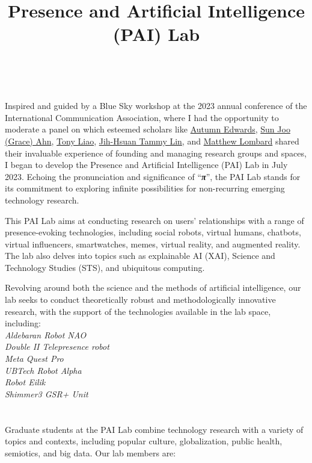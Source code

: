 \documentclass[]{article}
\title{Presence and Artificial Intelligence (PAI) Lab}
\author{}
\date{\vspace{-2.5em}}
\begin{document}
\maketitle

~

Inspired and guided by a Blue Sky workshop at the 2023 annual conference
of the International Communication Association, where I had the
opportunity to moderate a panel on which esteemed scholars like
\href{https://wmich.edu/communication/directory/edwards}{Autumn
Edwards}, \href{https://grady.uga.edu/faculty/sun-joo-grace-ahn/}{Sun
Joo (Grace) Ahn},
\href{https://dot.egr.uh.edu/departments/ilt/people/faculty/liao-tony}{Tony
Liao}, \href{https://drtammylin.com/}{Jih-Hsuan Tammy Lin}, and
\href{https://klein.temple.edu/directory/matthew-lombard-lombard}{Matthew
Lombard} shared their invaluable experience of founding and managing
research groups and spaces, I began to develop the Presence and
Artificial Intelligence (PAI) Lab in July 2023. Echoing the
pronunciation and significance of ``\textbf{\emph{π}}'', the PAI Lab
stands for its commitment to exploring infinite possibilities for
non-recurring emerging technology research.

This PAI Lab aims at conducting research on users' relationships with a
range of presence-evoking technologies, including social robots, virtual
humans, chatbots, virtual influencers, smartwatches, memes, virtual
reality, and augmented reality. The lab also delves into topics such as
explainable AI (XAI), Science and Technology Studies (STS), and
ubiquitous computing.

Revolving around both the science and the methods of artificial
intelligence, our lab seeks to conduct theoretically robust and
methodologically innovative research, with the support of the
technologies available in the lab space, including:\\
\emph{Aldebaran Robot NAO}\\
\emph{Double II Telepresence robot}\\
\emph{Meta Quest Pro}\\
\emph{UBTech Robot Alpha}\\
\emph{Robot Eilik}\\
\emph{Shimmer3 GSR+ Unit}\\
~\\
~\\
Graduate students at the PAI Lab combine technology research with a
variety of topics and contexts, including popular culture,
globalization, public health, semiotics, and big data. Our lab members
are:
\end{document}

